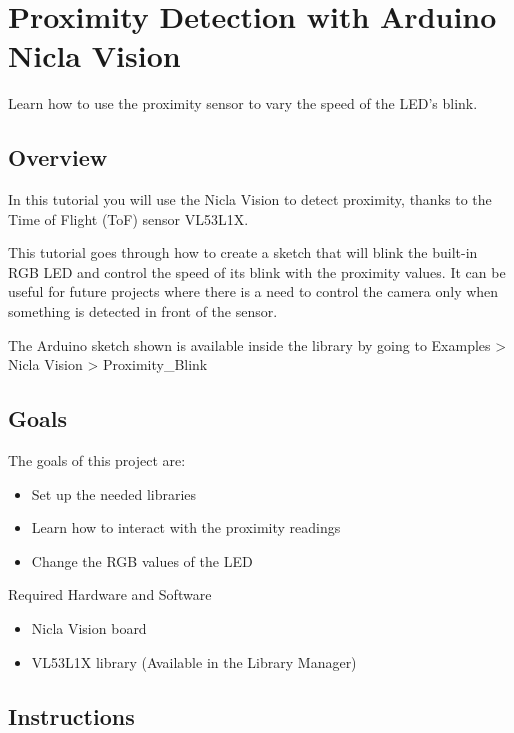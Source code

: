 
\section{Proximity Detection with Arduino Nicla Vision}

Learn how to use the proximity sensor to vary the speed of the LED's blink.

\subsection{Overview}

In this tutorial you will use the Nicla Vision to detect proximity, thanks to the Time of Flight (ToF) sensor VL53L1X.

This tutorial goes through how to create a sketch that will blink the built-in RGB LED and control the speed of its blink with the proximity values. It can be useful for future projects where there is a need to control the camera only when something is detected in front of the sensor.

The Arduino sketch shown is available inside the  library by going to Examples > Nicla Vision > Proximity\_Blink

\subsection{Goals}

The goals of this project are:

\begin{itemize}
  \item Set up the needed libraries
  \item Learn how to interact with the proximity readings
  \item Change the RGB values of the LED
\end{itemize}

Required Hardware and Software

\begin{itemize}
  \item Nicla Vision board
  \item VL53L1X library (Available in the Library Manager)
\end{itemize}

\subsection{Instructions}

